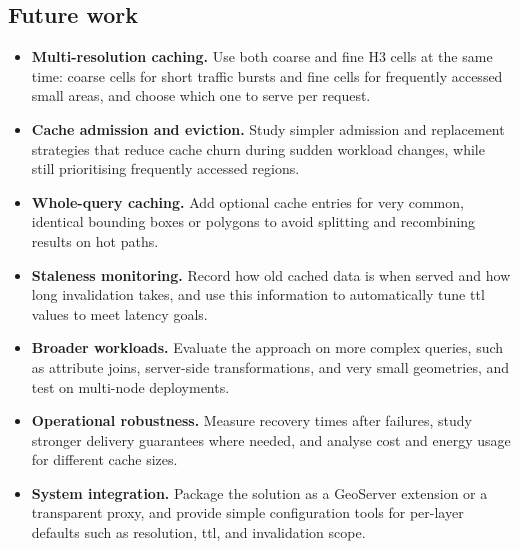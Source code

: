 \subsection{Future work}
\begin{itemize}
  \item \textbf{Multi-resolution caching.} Use both coarse and fine H3 cells at the same time: coarse cells for short traffic bursts and fine cells for frequently accessed small areas, and choose which one to serve per request.
  \item \textbf{Cache admission and eviction.} Study simpler admission and replacement strategies that reduce cache churn during sudden workload changes, while still prioritising frequently accessed regions.
  \item \textbf{Whole-query caching.} Add optional cache entries for very common, identical bounding boxes or polygons to avoid splitting and recombining results on hot paths.
  \item \textbf{Staleness monitoring.} Record how old cached data is when served and how long invalidation takes, and use this information to automatically tune \ac{ttl} values to meet latency goals.
  \item \textbf{Broader workloads.} Evaluate the approach on more complex queries, such as attribute joins, server-side transformations, and very small geometries, and test on multi-node deployments.
  \item \textbf{Operational robustness.} Measure recovery times after failures, study stronger delivery guarantees where needed, and analyse cost and energy usage for different cache sizes.
  \item \textbf{System integration.} Package the solution as a GeoServer extension or a transparent proxy, and provide simple configuration tools for per-layer defaults such as resolution, \ac{ttl}, and invalidation scope.
\end{itemize}

